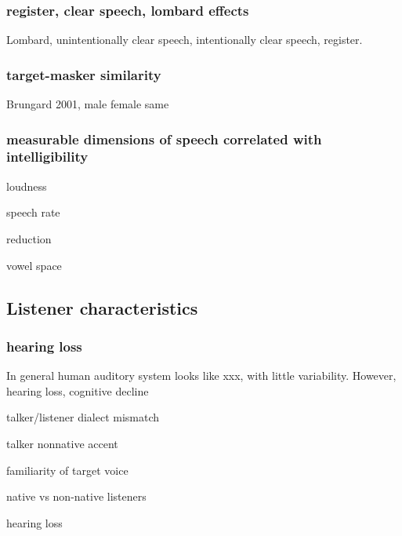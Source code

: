 \subsubsection{register, clear speech, lombard effects}
Lombard, unintentionally clear speech, intentionally clear speech, register.

\subsubsection{target-masker similarity}
Brungard 2001, male female same\citep{Brungart2001}

\subsubsection{measurable dimensions of speech correlated with intelligibility}
\begin{itm}
	\item{loudness}
	\item{speech rate}
	\item{reduction}
	\item{vowel space}
\end{itm}

\subsection{Listener characteristics}
\subsubsection{hearing loss}
In general human auditory system looks like xxx, with little variability.  However, hearing loss, cognitive decline

\begin{itm}
	\item{talker/listener dialect mismatch}
	\item{talker nonnative accent}
	\item{familiarity of target voice}
	\item{native vs non-native listeners \citep{CookeEtAl2008, CookeEtAl2010, BrouwerEtAl2012}}
	\item{hearing loss}
\end{itm}

